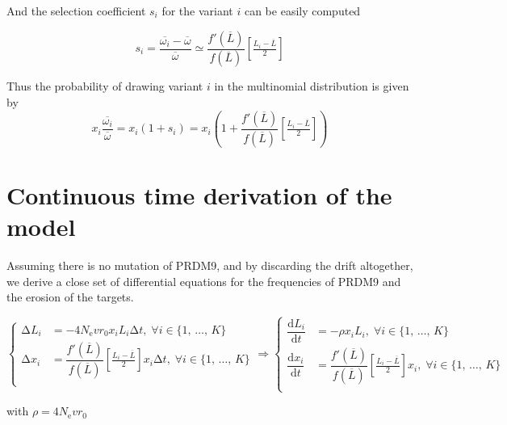\documentclass{article}
\begin{document}
And the selection coefficient $s_i$ for the variant $i$ can be easily computed  

\begin{equation}
    s_i = \dfrac{\overline{\omega_i} - \overline{\omega}}{\overline{\omega}}
    \simeq  \dfrac{f'(\overline{L})}{f(\overline{L})} \left[ \tfrac{L_i - \overline{L}}{2} \right]
\end{equation}

Thus the probability of drawing variant $i$ in the multinomial distribution is given by 
\begin{equation}
    x_i \dfrac{\overline{\omega_i}}{\overline{\omega}} = 
     x_i (1 + s_i) =  x_i \left(1 +  \dfrac{f'(\overline{L})}{f(\overline{L})} \left[ \tfrac{L_i - \overline{L}}{2} \right] \right)
\end{equation}

\section{Continuous time derivation of the model}
Assuming there is no mutation of PRDM9, and by discarding the drift altogether, we derive a close set of differential equations for the frequencies of PRDM9 and the erosion of the targets.

\begin{equation}
  \left\{
      \begin{aligned}
        \mathrm{\Delta}L_i &= 
        - 4 N_\mathrm{e} v r _0  x_i L_i \mathrm{\Delta}t, \;
             \forall i \in \{ 1, \, \dots, \, K \} \\
        \mathrm{\Delta}x_i &= \dfrac{f'(\overline{L})}{f(\overline{L})} \left[ \tfrac{L_i - \overline{L}}{2} \right]x_i  \mathrm{\Delta}t , \;
         \forall i \in \{ 1, \, \dots, \, K \}\\
      \end{aligned}
    \right.
 \Rightarrow
  \left\{
      \begin{aligned}
        \dfrac{\mathrm{d}L_i}{\mathrm{d}t} &= 
        - \rho  x_i L_i, \;
             \forall i \in \{ 1, \, \dots, \, K \} \\
        \dfrac{\mathrm{d}x_i}{\mathrm{d}t} &= \dfrac{f'(\overline{L})}{f(\overline{L})} \left[ \tfrac{L_i - \overline{L}}{2} \right]x_i , \;
         \forall i \in \{ 1, \, \dots, \, K \}\\
      \end{aligned}
    \right.
\end{equation}

with $\rho = 4 N_\mathrm{e} v r _0$
\end{document}
